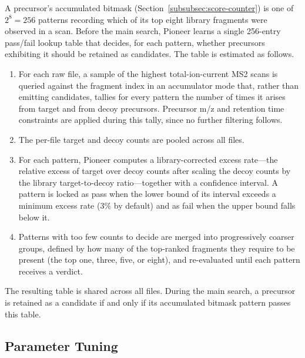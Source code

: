 \documentclass[pdflatex,sn-nature]{sn-jnl}
\begin{document}
A precursor's accumulated bitmask (Section~\ref{subsubsec:score-counter}) is one of $2^{8} = 256$ patterns recording which of its top eight library fragments were observed in a scan. Before the main search, Pioneer learns a single 256-entry pass/fail lookup table that decides, for each pattern, whether precursors exhibiting it should be retained as candidates. The table is estimated as follows.

\begin{enumerate}
\item For each raw file, a sample of the highest total-ion-current MS2 scans is queried against the fragment index in an accumulator mode that, rather than emitting candidates, tallies for every pattern the number of times it arises from target and from decoy precursors. Precursor m/z and retention time constraints are applied during this tally, since no further filtering follows.

\item The per-file target and decoy counts are pooled across all files.

\item For each pattern, Pioneer computes a library-corrected excess rate---the relative excess of target over decoy counts after scaling the decoy counts by the library target-to-decoy ratio---together with a confidence interval. A pattern is locked as pass when the lower bound of its interval exceeds a minimum excess rate ($3\%$ by default) and as fail when the upper bound falls below it.

\item Patterns with too few counts to decide are merged into progressively coarser groups, defined by how many of the top-ranked fragments they require to be present (the top one, three, five, or eight), and re-evaluated until each pattern receives a verdict.
\end{enumerate}

The resulting table is shared across all files. During the main search, a precursor is retained as a candidate if and only if its accumulated bitmask pattern passes this table.

\subsection{Parameter Tuning}\label{subsec:parameter-tuning}
\end{document}
